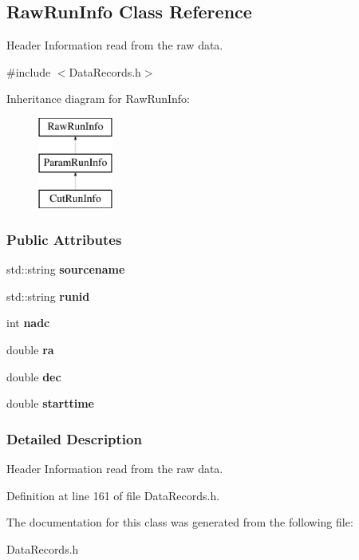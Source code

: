 \hypertarget{classRawRunInfo}{
\subsection{RawRunInfo Class Reference}
\label{classRawRunInfo}
}


Header Information read from the raw data.  




{\ttfamily \#include $<$DataRecords.h$>$}

Inheritance diagram for RawRunInfo:\begin{figure}[H]
\begin{center}
\leavevmode
\includegraphics[height=3.000000cm]{classRawRunInfo}
\end{center}
\end{figure}
\subsubsection*{Public Attributes}
\begin{DoxyCompactItemize}
\item 
\hypertarget{classRawRunInfo_a6e8ce531367afe08e6410a1112cf9239}{
std::string {\bfseries sourcename}}
\label{classRawRunInfo_a6e8ce531367afe08e6410a1112cf9239}

\item 
\hypertarget{classRawRunInfo_a8da01ce0afd73527dc533cd0ca53052c}{
std::string {\bfseries runid}}
\label{classRawRunInfo_a8da01ce0afd73527dc533cd0ca53052c}

\item 
\hypertarget{classRawRunInfo_a5f6b4e860d51518b7761ec06aeff550f}{
int {\bfseries nadc}}
\label{classRawRunInfo_a5f6b4e860d51518b7761ec06aeff550f}

\item 
\hypertarget{classRawRunInfo_a1f43e3129e80774302a5df71134ee57f}{
double {\bfseries ra}}
\label{classRawRunInfo_a1f43e3129e80774302a5df71134ee57f}

\item 
\hypertarget{classRawRunInfo_ac8d167b878630455968ebda6c27a4b56}{
double {\bfseries dec}}
\label{classRawRunInfo_ac8d167b878630455968ebda6c27a4b56}

\item 
\hypertarget{classRawRunInfo_a4a0fcbbbdc91a8382b9e30cf9f3caba4}{
double {\bfseries starttime}}
\label{classRawRunInfo_a4a0fcbbbdc91a8382b9e30cf9f3caba4}

\end{DoxyCompactItemize}


\subsubsection{Detailed Description}
Header Information read from the raw data. 

Definition at line 161 of file DataRecords.h.



The documentation for this class was generated from the following file:\begin{DoxyCompactItemize}
\item 
DataRecords.h\end{DoxyCompactItemize}
